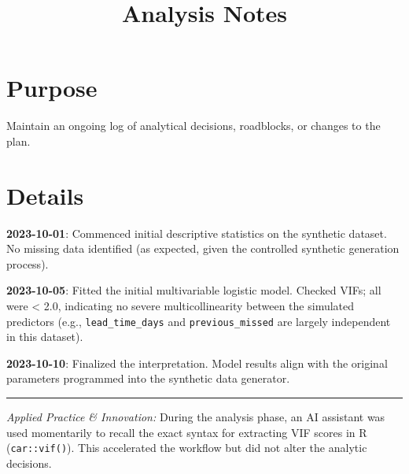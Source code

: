 \documentclass[
]{report}
\title{Analysis Notes}
\author{}
\date{}
\renewcommand*\contentsname{Table of contents}
\newcommand\contentsname{Table of contents}
\begin{document}
\maketitle

\renewcommand*\contentsname{Table of contents}
{
\hypersetup{linkcolor=}
\setcounter{tocdepth}{2}
\tableofcontents
}

\chapter{Purpose}\label{purpose}

Maintain an ongoing log of analytical decisions, roadblocks, or changes
to the plan.

\chapter{Details}\label{details}

\textbf{2023-10-01}: Commenced initial descriptive statistics on the
synthetic dataset. No missing data identified (as expected, given the
controlled synthetic generation process).

\textbf{2023-10-05}: Fitted the initial multivariable logistic model.
Checked VIFs; all were \textless{} 2.0, indicating no severe
multicollinearity between the simulated predictors (e.g.,
\texttt{lead\_time\_days} and \texttt{previous\_missed} are largely
independent in this dataset).

\textbf{2023-10-10}: Finalized the interpretation. Model results align
with the original parameters programmed into the synthetic data
generator.

\begin{center}\rule{0.5\linewidth}{0.5pt}\end{center}

\begin{tcolorbox}[enhanced jigsaw, colback=white, bottomrule=.15mm, titlerule=0mm, rightrule=.15mm, leftrule=.75mm, colframe=quarto-callout-note-color-frame, colbacktitle=quarto-callout-note-color!10!white, opacityback=0, toptitle=1mm, title=\textcolor{quarto-callout-note-color}{\faInfo}\hspace{0.5em}{AI Capability Checkpoint}, breakable, coltitle=black, bottomtitle=1mm, arc=.35mm, toprule=.15mm, left=2mm, opacitybacktitle=0.6]

\emph{Applied Practice \& Innovation:} During the analysis phase, an AI
assistant was used momentarily to recall the exact syntax for extracting
VIF scores in R (\texttt{car::vif()}). This accelerated the workflow but
did not alter the analytic decisions.

\end{tcolorbox}
\end{document}

